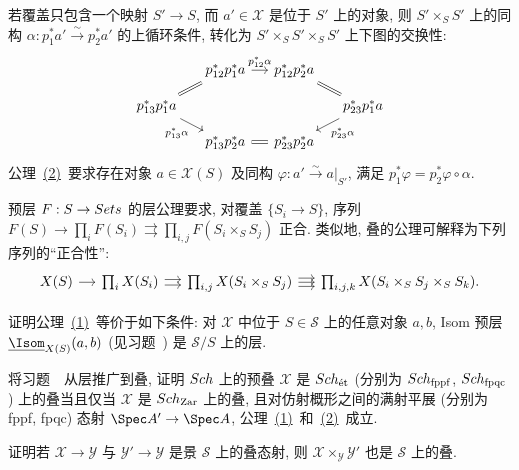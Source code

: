 \begin{remark}\label{src:3.5.2}
若覆盖只包含一个映射 $S'\to S$, 而 $a'\in\mathcal X$ 是位于 $S'$ 上的对象, 则 $S'\times_S S'$ 上的同构 $\alpha:p_1^*a'\xrightarrow{\sim}p_2^*a'$ 的上循环条件, 转化为 $S'\times_S S'\times_S S'$ 上下图的交换性:
\[
\begin{tikzcd}[column sep=small,row sep=small]
&p_{12}^*p_1^*a\arrow[r,"p_{12}^*\alpha"]&p_{12}^*p_2^*a\arrow[dr,equal]&{}\\
p_{13}^*p_1^*a\arrow[ur,equal]\arrow[dr,"p_{13}^*\alpha"']&&&p_{23}^*p_1^*a\arrow[dl,"p_{23}^*\alpha"]\\
&p_{13}^*p_2^*a\arrow[r,equal]&p_{23}^*p_2^*a&{}
\end{tikzcd}
\]
公理~\hyperlink{stack-axiom-2}{(2)}~要求存在对象 $a\in\mathcal X(S)$ 及同构 $\varphi:a'\xrightarrow{\sim}a|_{S'}$, 满足 $p_1^*\varphi=p_2^*\varphi\circ\alpha$.
\end{remark}
\begin{remark}\label{src:3.5.3}
预层 $F:S\to Sets$ 的层公理要求, 对覆盖 $\{S_i\to S\}$, 序列 $F(S)\to\prod_iF(S_i)\rightrightarrows\prod_{i,j}F(S_i\times_S S_j)$ 正合. 类似地, 叠的公理可解释为下列序列的``正合性'':
\[
\begin{tikzcd}[column sep=small]
\mathcal X(S)\arrow[r]&\prod_i\mathcal X(S_i)\arrow[r,shift left=2pt]\arrow[r,shift right=2pt]&
\prod_{i,j}\mathcal X(S_i\times_S S_j)\arrow[r,shift left=3pt]\arrow[r]\arrow[r,shift right=3pt]&
\prod_{i,j,k}\mathcal X(S_i\times_S S_j\times_S S_k).
\end{tikzcd}
\]
\end{remark}
\begin{exercise}\label{src:3.5.4}
证明公理~\hyperlink{stack-axiom-1}{(1)}~等价于如下条件: 对 $\mathcal X$ 中位于 $S\in\mathcal S$ 上的任意对象 $a,b$, Isom 预层 $\underline{\Isom}_{\mathcal X(S)}(a,b)$ (见习题~) 是 $\mathcal S/S$ 上的层.
\end{exercise}
\begin{exercise}\label{src:3.5.5}
将习题~~从层推广到叠, 证明 $Sch$ 上的预叠 $\mathcal X$ 是 $Sch_{\text{ét}}$ (分别为 $Sch_{\mathrm{fppf}}$, $Sch_{\mathrm{fpqc}}$) 上的叠当且仅当 $\mathcal X$ 是 $Sch_{\mathrm{Zar}}$ 上的叠, 且对仿射概形之间的满射平展 (分别为 fppf, fpqc) 态射 $\Spec A'\to\Spec A$, 公理~\hyperlink{stack-axiom-1}{(1)}~和~\hyperlink{stack-axiom-2}{(2)}~成立.
\end{exercise}
\begin{exercise}[叠的纤维积]\label{src:3.5.6}
证明若 $\mathcal X\to\mathcal Y$ 与 $\mathcal Y'\to\mathcal Y$ 是景 $\mathcal S$ 上的叠态射, 则 $\mathcal X\times_{\mathcal Y}\mathcal Y'$ 也是 $\mathcal S$ 上的叠.
\end{exercise}

